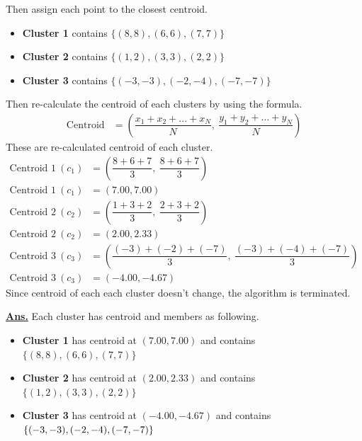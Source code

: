 \documentclass[12pt, a4paper]{article}
\newcommand{\ans}{\par\noindent\underline{\textbf{Ans.}} }
\begin{document}
\begin{enumerate}
            Then assign each point to the closest centroid.

            \begin{itemize}
                \item \textbf{Cluster 1} contains $\lbrace(8, 8), (6, 6), (7, 7)\rbrace$
                \item \textbf{Cluster 2} contains $\lbrace(1, 2), (3, 3), (2, 2)\rbrace$
                \item \textbf{Cluster 3} contains $\lbrace(-3, -3), (-2, -4), (-7, -7)\rbrace$
            \end{itemize}

            Then re-calculate the centroid of each clusters by using the formula.
            \begin{align*}
                \text{Centroid} & = \left( \dfrac{x_{1} + x_{2} + ... + x_{N}}{N}, \ \dfrac{y_{1} + y_{2} + ... + y_{N}}{N} \right)
            \end{align*}
            These are re-calculated centroid of each cluster.
            \begin{align*}
                \text{Centroid 1}\ (c_{1}) & = \left( \dfrac{8 + 6 + 7}{3},\ \dfrac{8 + 6 + 7}{3} \right) \\
                \text{Centroid 1}\ (c_{1}) & = (7.00, 7.00) \\[0.75em]
                \text{Centroid 2}\ (c_{2}) & = \left( \dfrac{1 + 3 + 2}{3},\ \dfrac{2 + 3 + 2}{3} \right) \\
                \text{Centroid 2}\ (c_{2}) & = (2.00, 2.33) \\[0.75em]
                \text{Centroid 3}\ (c_{3}) & = \left( \dfrac{(-3) + (-2) + (-7)}{3},\ \dfrac{(-3) + (-4) + (-7)}{3} \right) \\
                \text{Centroid 3}\ (c_{3}) & = (-4.00, -4.67)
            \end{align*}
            Since centroid of each each cluster doesn't change, the algorithm is terminated.
            \pagebreak

            \ans Each cluster has centroid and members as following.
            \begin{itemize}
                \item \textbf{Cluster 1} has centroid at $(7.00, 7.00)$ and contains $\lbrace(8, 8), (6, 6), (7, 7)\rbrace$
                \item \textbf{Cluster 2} has centroid at $(2.00, 2.33)$ and contains $\lbrace(1, 2), (3, 3), (2, 2)\rbrace$
                \item \textbf{Cluster 3} has centroid at $(-4.00, -4.67)$ and contains $\lbrace(-3, -3), (-2, -4), \\ (-7, -7)\rbrace$
            \end{itemize}
        \pagebreak


\end{enumerate}
\end{document}
